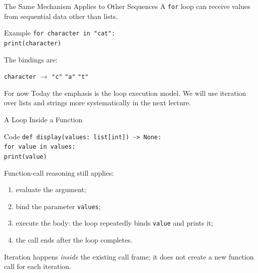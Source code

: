 \documentclass[aspectratio=169,10pt]{beamer}
\begin{document}
\begin{frame}{The Same Mechanism Applies to Other Sequences}
  A \texttt{for} loop can receive values from sequential data other than lists.

  \begin{block}{Example}
    \texttt{for character in "cat":}\\
    \hspace{0.20in}\texttt{print(character)}
  \end{block}

  The bindings are:
  \begin{center}
    \texttt{character} $\rightarrow$ \texttt{"c"}\qquad
    \texttt{"a"}\qquad
    \texttt{"t"}
  \end{center}

  \begin{alertblock}{For now}
    Today the emphasis is the loop execution model. We will use iteration over lists and strings more systematically in the next lecture.
  \end{alertblock}
\end{frame}

\begin{frame}{A Loop Inside a Function}
  \begin{block}{Code}
    \texttt{def display(values: list[int]) -> None:}\\
    \hspace{0.20in}\texttt{for value in values:}\\
    \hspace{0.40in}\texttt{print(value)}
  \end{block}

  Function-call reasoning still applies:
  \begin{enumerate}
    \item evaluate the argument;
    \item bind the parameter \texttt{values};
    \item execute the body: the loop repeatedly binds \texttt{value} and prints it;
    \item the call ends after the loop completes.
  \end{enumerate}

  \begin{keyidea}
    Iteration happens \emph{inside} the existing call frame; it does not create a new function call for each iteration.
  \end{keyidea}
\end{frame}
\end{document}
